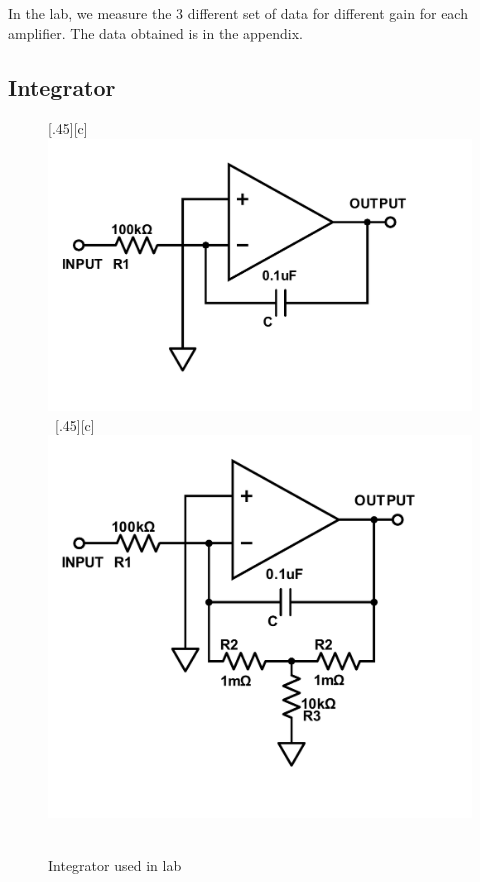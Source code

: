 \documentclass[aps,prl,reprint]{revtex4-1}
\begin{document}
        In the lab, we measure the 3 different set of data for different gain for each amplifier. The data obtained is in the appendix.
    \subsection{Integrator}
        \begin{figure}[h]
            \centering
            [.45\linewidth][c]{%
                \includegraphics[width=.4\linewidth]{image/integrator/Integrator-Lab.pdf}}\ 
            [.45\linewidth][c]{%
                \includegraphics[width=.4\linewidth]{image/integrator/T-network.pdf}}\ 
            \caption{Integrator used in lab}
            \label{fig:integratorLab}
        \end{figure}
\end{document}
